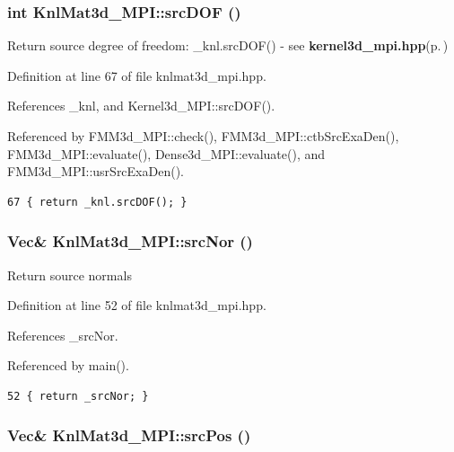 \subsubsection{\setlength{\rightskip}{0pt plus 5cm}int Knl\-Mat3d\_\-MPI::src\-DOF ()\hspace{0.3cm}{\tt  [inline]}}\label{classKnlMat3d__MPI_6b422ba557bb24eff82ac7125e206568_6b422ba557bb24eff82ac7125e206568}


Return source degree of freedom: \_\-knl.src\-DOF() - see {\bf kernel3d\_\-mpi.hpp}{\rm (p.\,\pageref{kernel3d__mpi_8hpp})} 

Definition at line 67 of file knlmat3d\_\-mpi.hpp.

References \_\-knl, and Kernel3d\_\-MPI::src\-DOF().

Referenced by FMM3d\_\-MPI::check(), FMM3d\_\-MPI::ctb\-Src\-Exa\-Den(), FMM3d\_\-MPI::evaluate(), Dense3d\_\-MPI::evaluate(), and FMM3d\_\-MPI::usr\-Src\-Exa\-Den().

\footnotesize\begin{verbatim}67 { return _knl.srcDOF(); }
\end{verbatim}\normalsize 


\subsubsection{\setlength{\rightskip}{0pt plus 5cm}Vec\& Knl\-Mat3d\_\-MPI::src\-Nor ()\hspace{0.3cm}{\tt  [inline]}}\label{classKnlMat3d__MPI_bba2c6a917421951f1fbe8f69b9a135b_bba2c6a917421951f1fbe8f69b9a135b}


Return source normals 

Definition at line 52 of file knlmat3d\_\-mpi.hpp.

References \_\-src\-Nor.

Referenced by main().

\footnotesize\begin{verbatim}52 { return _srcNor; }
\end{verbatim}\normalsize 


\subsubsection{\setlength{\rightskip}{0pt plus 5cm}Vec\& Knl\-Mat3d\_\-MPI::src\-Pos ()\hspace{0.3cm}{\tt  [inline]}}\label{classKnlMat3d__MPI_caa1dae06f56964efa0f778b696dce61_caa1dae06f56964efa0f778b696dce61}


